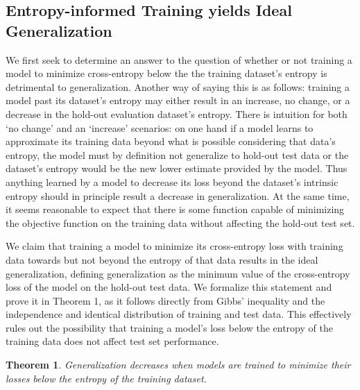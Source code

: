 \documentclass{article}
\begin{document}
    \subsection{Entropy-informed Training yields Ideal Generalization}
    
    We first seek to determine an answer to the question of whether or not training a model to minimize cross-entropy below the the training dataset's entropy is detrimental to generalization.  Another way of saying this is as follows: training a model past its dataset's entropy may either result in an increase, no change, or a decrease in the hold-out evaluation dataset's entropy.  There is intuition for both `no change' and an `increase' scenarios: on one hand if a model learns to approximate its training data beyond what is possible considering that data's entropy, the model must by definition not generalize to hold-out test data or the dataset's entropy would be the new lower estimate provided by the model. Thus anything learned by a model to decrease its loss beyond the dataset's intrinsic entropy should in principle result a decrease in generalization. At the same time, it seems reasonable to expect that there is some function capable of minimizing the objective function on the training data without affecting the hold-out test set.

    We claim that training a model to minimize its cross-entropy loss with training data towards but not beyond the entropy of that data results in the ideal generalization, defining generalization as the minimum value of the cross-entropy loss of the model on the hold-out test data. We formalize this statement and prove it in Theorem 1, as it follows directly from Gibbs' inequality and the independence and identical distribution of training and test data. This effectively rules out the possibility that training a model's loss below the entropy of the training data does not affect test set performance. 

    \topsep=12pt
    \newtheorem{theorem}{Theorem}

    \begin{theorem}
        Generalization decreases when models are trained to minimize their losses below the entropy of the training dataset.
    \end{theorem}
\end{document}
